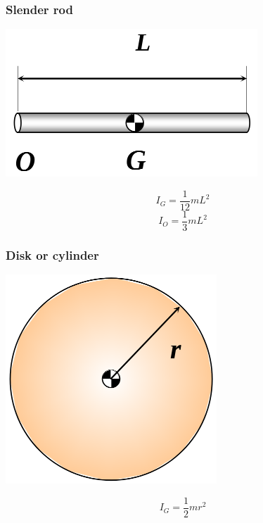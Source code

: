 \documentclass[11pt]{article}
\begin{document}
\subsubsection{Slender rod}
\label{sec:org5527606}
\begin{center}
\includegraphics[width=.9\linewidth]{./images/moment-of-inertia-slender-rod-diagram.png}
\end{center}
\[I_G = \frac{1}{12} mL^2\]
\[I_O = \frac{1}{3} mL^2\]
\subsubsection{Disk or cylinder}
\label{sec:orga430327}
\begin{center}
\includegraphics[width=.9\linewidth]{./images/moment-of-inertia-cylinder-or-disk-diagram.png}
\end{center}
\[I_G = \frac{1}{2} mr^2\]
\end{document}

